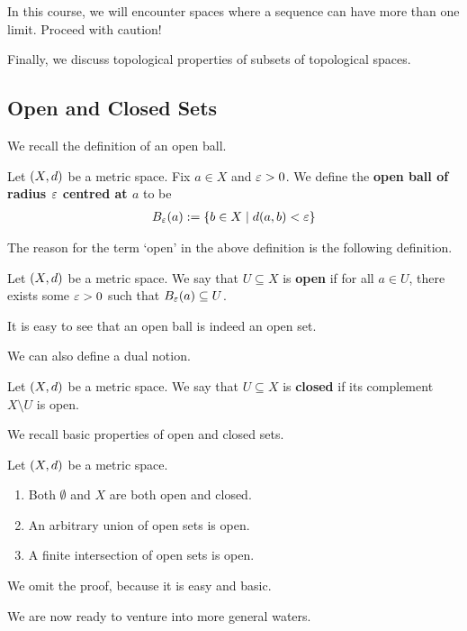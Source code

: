 \begin{boxwarning}
    In this course, we will encounter spaces where a sequence can have more than one limit. Proceed with caution!
\end{boxwarning}

Finally, we discuss topological properties of subsets of topological spaces.

\subsection{Open and Closed Sets}

We recall the definition of an open ball.

\begin{boxdefinition}
    Let $\left( X, d \right)$ be a metric space. Fix $a \in X$ and $\varepsilon > 0$. We define the \textbf{open ball of radius $\varepsilon$ centred at $a$} to be
    \begin{align*}
        B_{\varepsilon}\!\left( a \right) := \left\{ b \in X \; \middle\vert \; d\!\left( a, b \right) < \varepsilon \right\}
    \end{align*}
\end{boxdefinition}

The reason for the term `open' in the above definition is the following definition.

\begin{boxdefinition}\label{Ch1:Def:Open_Sets_Metric_Spaces}
    Let $\left( X, d \right)$ be a metric space. We say that $U \subseteq X$ is \textbf{open} if for all $a \in U$, there exists some $\varepsilon > 0$ such that $B_{\varepsilon}\!\left( a \right) \subseteq U$.
\end{boxdefinition}

It is easy to see that an open ball is indeed an open set.

We can also define a dual notion.

\begin{boxdefinition}
    Let $\left( X, d \right)$ be a metric space. We say that $U \subseteq X$ is \textbf{closed} if its complement $X \setminus U$ is open.
\end{boxdefinition}

We recall basic properties of open and closed sets.

\begin{boxproposition}\label{Ch1:Prop:Properties_of_Open_Sets}
    Let $\left( X, d \right)$ be a metric space.
    \begin{enumerate}
        \item Both $\emptyset$ and $X$ are both open and closed.
        \item An arbitrary union of open sets is open.
        \item A finite intersection of open sets is open.
    \end{enumerate}
\end{boxproposition}

We omit the proof, because it is easy and basic.

We are now ready to venture into more general waters.
